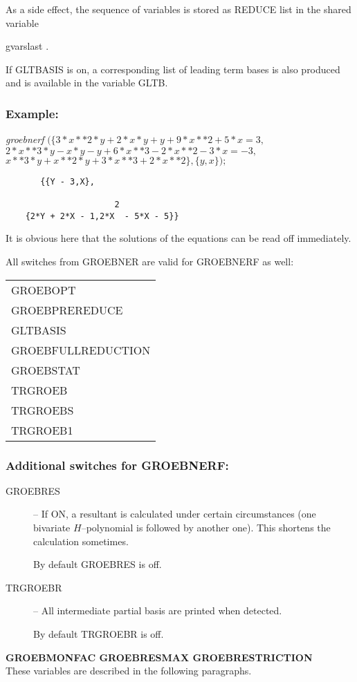As a side effect, the sequence of variables is stored as REDUCE list in
the shared variable
\begin{center}
gvarslast .
\end{center}
If GLTBASIS is on, a corresponding list of leading term bases is
also produced and is available in the variable GLTB.

\subsubsection*{Example:}

{\it groebnerf} $(\{ 3*x**2*y + 2*x*y + y + 9*x**2 + 5*x = 3,$  \\
\hspace*{+1cm} $ 2*x**3*y - x*y - y + 6*x**3 - 2*x**2 - 3*x = -3, $\\
\hspace*{+1cm} $ x**3*y + x**2*y + 3*x**3 + 2*x**2 \}, \{y,x\});$

\begin{verbatim}
       {{Y - 3,X},

                      2
    {2*Y + 2*X - 1,2*X  - 5*X - 5}}
\end{verbatim}

It is obvious here that the solutions of the equations can be read
off immediately.

All switches from GROEBNER are valid for GROEBNERF as well:
\begin{center}
\begin{tabular}{l}
GROEBOPT \\
GROEBPREREDUCE \\
GLTBASIS \\
GROEBFULLREDUCTION \\
GROEBSTAT \\
TRGROEB \\
TRGROEBS \\
TRGROEB1
\end{tabular}
\end{center}

\subsubsection*{Additional switches for GROEBNERF:}
\begin{description}
\item[GROEBRES] -- If ON, a resultant is calculated under certain
circumstances (one bivariate $H$--polynomial is followed by another
one). This shortens the calculation sometimes.

By default GROEBRES is off.

\item[TRGROEBR] -- All intermediate partial basis are printed when
detected.

By default TRGROEBR is off.
\end{description}
{\bf GROEBMONFAC  GROEBRESMAX  GROEBRESTRICTION} \\
\hspace*{.5cm} These variables are described in the following
paragraphs.

